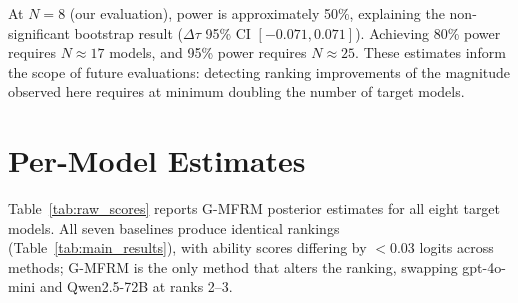 At $N = 8$ (our evaluation), power is approximately 50\%, explaining the non-significant bootstrap result ($\Delta\tau$ 95\% CI $[-0.071, 0.071]$). Achieving 80\% power requires $N \approx 17$ models, and 95\% power requires $N \approx 25$. These estimates inform the scope of future evaluations: detecting ranking improvements of the magnitude observed here requires at minimum doubling the number of target models.


\section{Per-Model Estimates}
\label{app:raw_scores}

Table~\ref{tab:raw_scores} reports G-MFRM posterior estimates for all eight target models. All seven baselines produce identical rankings (Table~\ref{tab:main_results}), with ability scores differing by $< 0.03$ logits across methods; G-MFRM is the only method that alters the ranking, swapping gpt-4o-mini and Qwen2.5-72B at ranks 2--3.

\begin{table}[h]
\centering
\scriptsize
\setlength{\tabcolsep}{3pt}
\caption{G-MFRM posterior estimates for ability ($\hat{\theta}$) and contamination susceptibility ($\hat{c}_n$) with approximate 95\% credible intervals (empirical coverage ${\sim}$71\%; see Limitations). Point estimates and rank orderings are the primary results. ``Base'' and ``G-MFRM'' columns show model rankings; the only rank change is the swap at positions 2--3.}
\label{tab:raw_scores}
\end{table}


